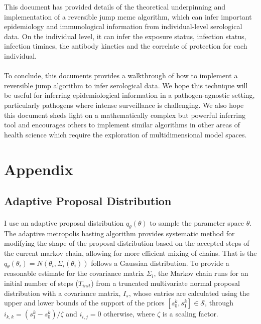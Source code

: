 \documentclass{article}
\begin{document}
This document has provided details of the theoretical underpinning and implementation of a reversible jump mcmc algorithm, which can infer important epidemiology and immunological information from individual-level serological data. On the individual level, it can infer the exposure status, infection status, infection timines, the antibody kinetics and the correlate of protection for each individual.
\paragraph{}To conclude, this documents provides a walkthrough of how to implement a reversible jump algorithm to infer serological data. We hope this technique will be useful for inferring epidemiological information in a pathogen-agnostic setting, particularly pathogens where intense surveillance is challenging. We also hope this document sheds light on a mathematically complex but powerful inferring tool and encourages others to implement similar algorithms in other areas of health science which require the exploration of multidimensional model spaces. 

\section{Appendix}
\subsection{Adaptive Proposal Distribution}

\paragraph{}I use an adaptive proposal distribution $q_\theta(\theta)$ to sample the parameter space $\theta$. The adaptive metropolis hasting algorithm provides systematic method for modifying the shape of the proposal distribution based on the accepted steps of the current markov chain, allowing for more efficient mixing of chains. That is the $q_\theta(\theta_i) = N(\theta_i, \Sigma_i(\theta_i))$ follows a Gaussian distribution. To provide a reasonable estimate for the covariance matrix $\Sigma_i$, the Markov chain runs for an initial number of steps ($T_{init}$) from a truncated multivariate normal proposal distribution with a covariance matrix, $I_s$, whose entries are calculated using the upper and lower bounds of the support of the priors $[s^k_0, s^k_1] \in \mathcal{S}$, through $i_{k,k} = (s^k_1 - s^k_0)/\zeta$ and $i_{i,j} = 0$ otherwise, where $\zeta$ is a scaling factor.
 
\end{document}
